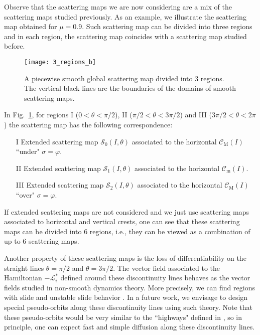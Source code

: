 \documentclass[a4paper,10pt]{article}
\newcommand{\M}{\text{M}}
\newcommand{\m}{\text{m}}
\theoremstyle{definition}
\begin{document}
Observe that the scattering maps we are now considering are a mix of the scattering maps studied previously.
As an example, we illustrate the scattering map obtained for $\mu = 0.9$.
Such scattering map can be divided into three regions and in each region, the scattering map coincides with a scattering map studied before.

\begin{figure}[h]
\centering
\texttt{[image: 3\_regions\_b]}
\caption{A piecewise smooth global scattering map divided into 3 regions. The vertical black lines are the boundaries of
the domains of smooth scattering maps.\label{fig:3_regions}}
\end{figure}

In Fig.~\ref{fig:3_regions}, for regions I ($0<\theta<\pi/2$), II ($\pi/2<\theta<3\pi/2$) and III ($3\pi/2<\theta<2\pi$) the scattering map has the following correspondence:
\begin{itemize}
\item[I] Extended scattering map $\mathcal{S}_0(I,\theta)$ associated to the horizontal $\mathcal{C}_{\M}(I)$ ``under" $\sigma = \varphi$.
\item[II] Extended scattering map $\mathcal{S}_1(I,\theta)$ associated to the horizontal $\mathcal{C}_{\m}(I)$.
\item[III] Extended scattering map $\mathcal{S}_{2}(I,\theta)$ associated to the horizontal $\mathcal{C}_{\M}(I)$ ``over" $\sigma = \varphi$.
\end{itemize}

If extended scattering maps are not considered and we just use scattering maps associated to horizontal and vertical crests, one can see that these scattering maps can be divided into 6 regions, i.e., they can be viewed as a combination of up to 6 scattering maps.

Another property of these scattering maps is the loss of differentiability on the straight lines $\theta = \pi/2$ and $\theta = 3\pi/2$.
The vector field associated to the Hamiltonian $-\mathcal{L}_i^*$ defined around these discontinuity lines behaves as the vector fields studied in non-smooth dynamics theory.
More precisely, we can find regions with slide and unstable slide behavior \cite{Filippov88}.
In a future work, we envisage to design special pseudo-orbits along these discontinuity lines using such theory.
Note that these pseudo-orbits would be very similar to the ``highways" defined in \cite{Delshams2017}, so in principle, one can expect fast and simple diffusion along these discontinuity lines.
\end{document}
